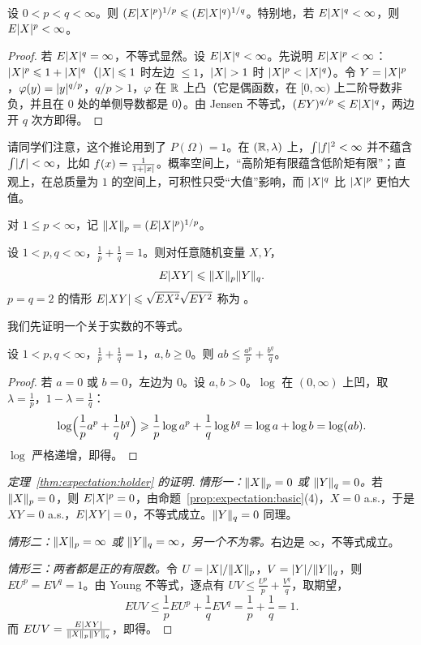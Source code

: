 \begin{corollary}[矩的单调性]\label{cor:expectation:lyapunov}
设 $0<p<q<\infty$。则 $(E\lvert X\rvert^p)^{1/p}\leqslant(E\lvert X\rvert^q)^{1/q}$。特别地，若 $E\lvert X\rvert^q<\infty$，则 $E\lvert X\rvert^p<\infty$。
\end{corollary}
\begin{proof}
若 $E\lvert X\rvert^q=\infty$，不等式显然。设 $E\lvert X\rvert^q<\infty$。先说明 $E\lvert X\rvert^p<\infty$：$\lvert X\rvert^p\leqslant1+\lvert X\rvert^q$（$\lvert X\rvert\leqslant1$ 时左边 $\leqslant1$，$\lvert X\rvert>1$ 时 $\lvert X\rvert^p<\lvert X\rvert^q$）。令 $Y=\lvert X\rvert^p$，$\varphi(y)=\lvert y\rvert^{q/p}$，$q/p>1$，$\varphi$ 在 $\mathbb{R}$ 上凸（它是偶函数，在 $[0,\infty)$ 上二阶导数非负，并且在 $0$ 处的单侧导数都是 $0$）。由 Jensen 不等式，$(EY)^{q/p}\leqslant E\lvert X\rvert^q$，两边开 $q$ 次方即得。
\end{proof}

请同学们注意，这个推论用到了 $P(\Omega)=1$。在 $(\mathbb{R},\lambda)$ 上，$\int\lvert f\rvert^2<\infty$ 并不蕴含 $\int\lvert f\rvert<\infty$，比如 $f(x)=\frac1{1+\lvert x\rvert}$。概率空间上，“高阶矩有限蕴含低阶矩有限”；直观上，在总质量为 $1$ 的空间上，可积性只受“大值”影响，而 $\lvert X\rvert^q$ 比 $\lvert X\rvert^p$ 更怕大值。


对 $1\leqslant p<\infty$，记 $\lVert X\rVert_p=(E\lvert X\rvert^p)^{1/p}$。

\begin{theorem}\label{thm:expectation:holder}
设 $1<p,q<\infty$，$\frac1p+\frac1q=1$。则对任意随机变量 $X,Y$，
\[
E\lvert XY\rvert\leqslant\lVert X\rVert_p\lVert Y\rVert_q .
\]
$p=q=2$ 的情形 $E\lvert XY\rvert\leqslant\sqrt{EX^2}\sqrt{EY^2}$ 称为 。
\end{theorem}

我们先证明一个关于实数的不等式。

\begin{lemma}\label{lem:expectation:young}
设 $1<p,q<\infty$，$\frac1p+\frac1q=1$，$a,b\geqslant0$。则 $ab\leqslant\frac{a^p}p+\frac{b^q}q$。
\end{lemma}
\begin{proof}
若 $a=0$ 或 $b=0$，左边为 $0$。设 $a,b>0$。$\log$ 在 $(0,\infty)$ 上凹，取 $\lambda=\frac1p$，$1-\lambda=\frac1q$：
\[
\log\Bigl(\frac1pa^p+\frac1qb^q\Bigr)\geqslant\frac1p\log a^p+\frac1q\log b^q=\log a+\log b=\log(ab).
\]
$\log$ 严格递增，即得。
\end{proof}

\begin{proof}[定理~\ref{thm:expectation:holder} 的证明]
\emph{情形一：$\lVert X\rVert_p=0$ 或 $\lVert Y\rVert_q=0$。}若 $\lVert X\rVert_p=0$，则 $E\lvert X\rvert^p=0$，由命题~\ref{prop:expectation:basic}(4)，$X=0$ a.s.，于是 $XY=0$ a.s.，$E\lvert XY\rvert=0$，不等式成立。$\lVert Y\rVert_q=0$ 同理。

\emph{情形二：$\lVert X\rVert_p=\infty$ 或 $\lVert Y\rVert_q=\infty$，另一个不为零。}右边是 $\infty$，不等式成立。

\emph{情形三：两者都是正的有限数。}令 $U=\lvert X\rvert/\lVert X\rVert_p$，$V=\lvert Y\rvert/\lVert Y\rVert_q$，则 $EU^p=EV^q=1$。由 Young 不等式，逐点有 $UV\leqslant\frac{U^p}p+\frac{V^q}q$，取期望，
\[
EUV\leqslant\frac1pEU^p+\frac1qEV^q=\frac1p+\frac1q=1 .
\]
而 $EUV=\frac{E\lvert XY\rvert}{\lVert X\rVert_p\lVert Y\rVert_q}$，即得。
\end{proof}

